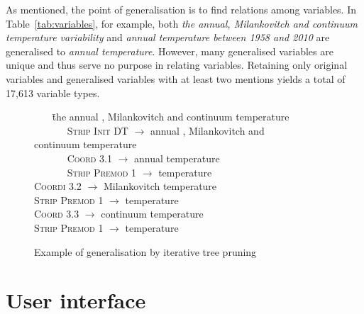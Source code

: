 \documentclass[11pt]{article}
\begin{document}
As mentioned, the point of generalisation is to find relations among variables.
In Table~\ref{tab:variables}, for example,  both \emph{the annual, Milankovitch and continuum temperature variability } and \emph{annual temperature between 1958 and 2010} are generalised to \emph{annual temperature}.
However, many generalised variables are unique and thus serve no purpose in relating variables.
Retaining only original variables and generalised variables with at least two mentions yields a total of 17,613 variable types. %

\begin{figure}[tbh]
\begin{small}
\begin{tabbing}
~~~ \= the annual , Milankovitch and continuum temperature \\
\> ~~~~~~ \= \textsc{Strip Init DT} $\rightarrow$ annual , Milankovitch and \\
\>                                              \>                       continuum temperature \\
\>         \> ~~~~~~ \= \textsc{Coord 3.1} $\rightarrow$  annual temperature \\
\>         \> \> ~~~~~~ \=   \textsc{Strip Premod 1} $\rightarrow$  temperature \\
\>         \> \>  \textsc{Coordi 3.2} $\rightarrow$  Milankovitch temperature \\
\>            \> \> \>         \textsc{Strip Premod 1} $\rightarrow$  temperature \\
\>            \> \> \textsc{Coord 3.3} $\rightarrow$ continuum temperature \\
 \>            \> \> \>        \textsc{Strip Premod 1} $\rightarrow$  temperature \\
\end{tabbing}
\end{small}
\vspace{-8mm}
\caption{Example of generalisation by iterative tree pruning}
\label{fig:gen}
\end{figure}

\section{User interface}
\end{document}

